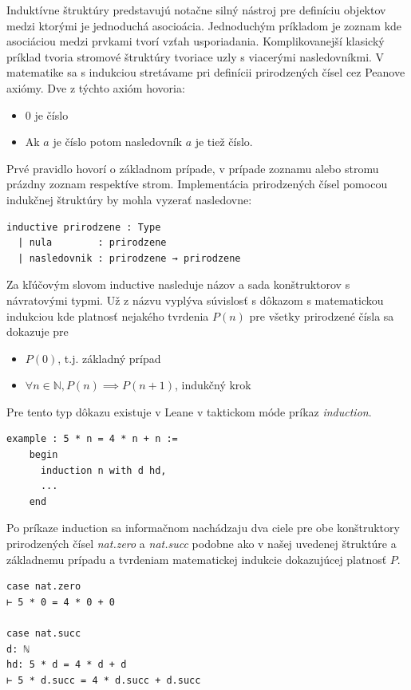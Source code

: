 \documentclass[a4paper,10pt,oneside]{report}%
\begin{document}
    Induktívne štruktúry predstavujú notačne silný nástroj pre definíciu objektov
medzi ktorými je jednoduchá asocioácia.
    Jednoduchým príkladom je zoznam kde asociáciou medzi prvkami tvorí vzťah
usporiadania.
    Komplikovanejší klasický príklad tvoria stromové štruktúry tvoriace uzly
s viacerými nasledovníkmi.
    V matematike sa s indukciou stretávame pri definícii prirodzených čísel
cez Peanove axiómy.
    Dve z týchto axióm hovoria:
\begin{itemize}
    \item 0 je číslo
    \item Ak $a$ je číslo potom nasledovník $a$ je tiež číslo.
\end{itemize}
    Prvé pravidlo hovorí o základnom prípade, v prípade zoznamu alebo stromu prázdny
zoznam respektíve strom.
    Implementácia prirodzených čísel pomocou indukčnej štruktúry by mohla vyzerať
nasledovne:
\begin{lstlisting}
inductive prirodzene : Type
  | nula        : prirodzene
  | nasledovnik : prirodzene → prirodzene
\end{lstlisting}
    Za kľúčovým slovom inductive nasleduje názov a sada konštruktorov s návratovými
typmi.
    Už z názvu vyplýva súvislosť s dôkazom s matematickou indukciou kde platnosť
nejakého tvrdenia $P(n)$ pre všetky prirodzené čísla sa dokazuje pre
\begin{itemize}
    \item $P(0)$, t.j. základný prípad
    \item $\forall n \in \mathbb{N}, P(n) \implies P(n+1)$, indukčný krok
\end{itemize}
    Pre tento typ dôkazu existuje v Leane v taktickom móde príkaz \emph{induction}.
\begin{lstlisting}
example : 5 * n = 4 * n + n :=
    begin
      induction n with d hd,
      ...
    end
\end{lstlisting}
    Po príkaze induction sa informačnom nachádzaju dva ciele pre obe konštruktory
prirodzených čísel \emph{nat.zero} a \emph{nat.succ} podobne ako v našej uvedenej
štruktúre a základnemu prípadu a tvrdeniam matematickej indukcie dokazujúcej platnosť
$P$.
\begin{lstlisting}
case nat.zero
⊢ 5 * 0 = 4 * 0 + 0

case nat.succ
d: ℕ
hd: 5 * d = 4 * d + d
⊢ 5 * d.succ = 4 * d.succ + d.succ
\end{lstlisting}
\end{document}
